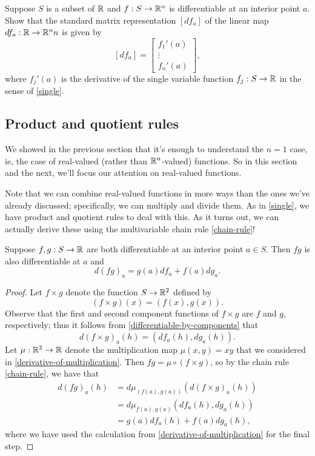\begin{exercise}
	Suppose $S$ is a subset of $\mathbb{R}$ and $f : S \to \mathbb{R}^n$ is differentiable at an interior point $a$. Show that the standard matrix representation $[df_a]$ of the linear map $df_a : \mathbb{R} \to \mathbb{R}^nn$ is given by 
	\[ [df_a] = \begin{bmatrix} f_1'(a) \\ \vdots \\ f_n'(a) \end{bmatrix}, \]
	where $f_j'(a)$ is the derivative of the single variable function $f_j : S \to \mathbb{R}$ in the sense of \cref{single}. 
\end{exercise}

\subsection{Product and quotient rules}

We showed in the previous section that it's enough to understand the $n = 1$ case, ie, the case of real-valued (rather than $\mathbb{R}^n$-valued) functions. So in this section and the next, we'll focus our attention on real-valued functions. 

Note that we can combine real-valued functions in more ways than the ones we've already discussed; specifically, we can multiply and divide them. As in \cref{single}, we have product and quotient rules to deal with this. As it turns out, we can actually derive these using the multivariable chain rule \ref{chain-rule}!

\begin{proposition} \label{product-rule} 
	Suppose $f, g : S \to \mathbb{R}$ are both differentiable at an interior point $a \in S$. Then $fg$ is also differentiable at $a$ and
	\[ d(fg)_a = g(a)df_a + f(a) dg_a. \]
\end{proposition}

\begin{proof}
	Let $f \times g$ denote the function $S \to \mathbb{R}^2$ defined by
	\[ (f \times g)(x) = (f(x), g(x)). \]
	Observe that the first and second component functions of $f \times g$ are $f$ and $g$, respectively; thus it follows from \cref{differentiable-by-components} that 
	\[ d(f \times g)_a(h) = (df_a(h), dg_a(h)). \]
	Let $\mu : \mathbb{R}^2 \to \mathbb{R}$ denote the multiplication map $\mu(x,y) = xy$ that we considered in \cref{derivative-of-multiplication}. Then $fg = \mu \circ (f \times g)$, so by the chain rule \ref{chain-rule}, we have that 
	\[ \begin{aligned} d(fg)_a(h) &= d\mu_{(f(a),g(a))}(d(f \times g)_a(h)) \\
	&= d\mu_{f(a),g(a)}(df_a(h), dg_a(h)) \\
	&= g(a) df_a(h) + f(a)dg_a(h), \end{aligned} \]
	where we have used the calculation from \cref{derivative-of-multiplication} for the final step. 
\end{proof}

